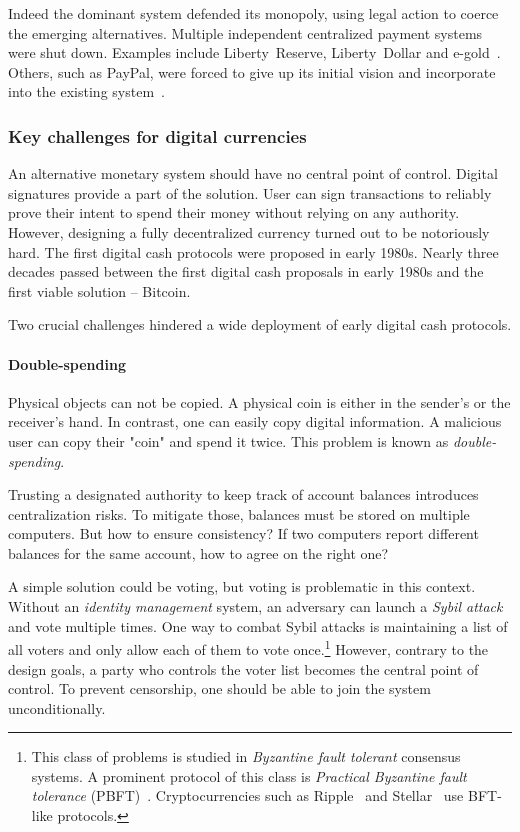 Indeed the dominant system defended its monopoly, using legal action to coerce the emerging alternatives.
Multiple independent centralized payment systems were shut down.
Examples include Liberty~Reserve, Liberty~Dollar and e-gold~\cite{White2014, Trautman2014}.
Others, such as PayPal, were forced to give up its initial vision and incorporate into the existing system~\cite{Jackson2017}.


\subsubsection*{Key challenges for digital currencies}

An alternative monetary system should have no central point of control.
Digital signatures provide a part of the solution.
User can sign transactions to reliably prove their intent to spend their money without relying on any authority.
However, designing a fully decentralized currency turned out to be notoriously hard.
The first digital cash protocols were proposed in early 1980s.
Nearly three decades passed between the first digital cash proposals in early 1980s and the first viable solution -- Bitcoin.

Two crucial challenges hindered a wide deployment of early digital cash protocols.

\paragraph{Double-spending}

Physical objects can not be copied.
A physical coin is either in the sender's or the receiver's hand.
In contrast, one can easily copy digital information.
A malicious user can copy their "coin" and spend it twice.
This problem is known as \textit{double-spending}.

Trusting a designated authority to keep track of account balances introduces centralization risks.
To mitigate those, balances must be stored on multiple computers.
But how to ensure consistency?
If two computers report different balances for the same account, how to agree on the right one?

A simple solution could be voting, but voting is problematic in this context.
Without an \textit{identity management} system, an adversary can launch a \textit{Sybil attack} and vote multiple times.
One way to combat Sybil attacks is maintaining a list of all voters and only allow each of them to vote once.\footnote{This class of problems is studied in \textit{Byzantine fault tolerant} consensus systems.
A prominent protocol of this class is \textit{Practical Byzantine fault tolerance} (PBFT)~\cite{Castro2002}.
Cryptocurrencies such as Ripple~\cite{Schwartz2014} and Stellar~\cite{Mazieres2014} use BFT-like protocols.}
However, contrary to the design goals, a party who controls the voter list becomes the central point of control.
To prevent censorship, one should be able to join the system unconditionally.

